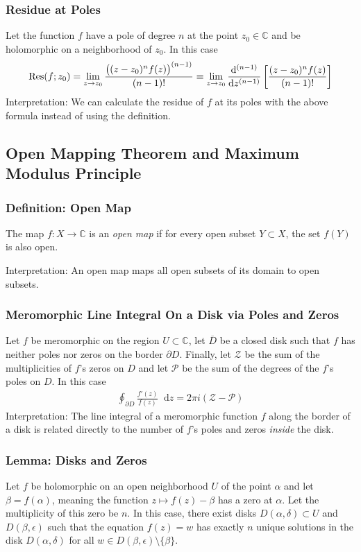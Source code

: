 \documentclass[11pt, a4paper]{article}
\newcommand{\diff}{\mathop{}\!\mathrm{d}} %
\newcommand{\C}{\mathbb{C}} %
\begin{document}
\subsubsection{Residue at Poles}
Let the function $ f $ have a pole of degree $ n $ at the point $ z_0 \in \C $ and be holomorphic on a neighborhood of $ z_0 $. In this case
\begin{align*}
	\Res(f; z_0) = \lim_{z \to z_0} \frac{\big(  (z-z_0)^n f(z)\big)^{(n-1)}}{(n-1)!} \equiv \lim_{z\to z_0} \dv[(n-1)]{}{z} \left[\frac{(z-z_0)^n f(z)}{(n-1)!}\right]
\end{align*}
Interpretation: We can calculate the residue of $ f $ at its poles with the above formula instead of using the definition.


\subsection{Open Mapping Theorem and Maximum Modulus Principle}

\subsubsection{Definition: Open Map}
The map $ f:X \to \C $ is an \textit{open map} if for every open subset $ Y \subset X $, the set $ f(Y) $ is also open.

Interpretation: An open map maps all open subsets of its domain to open subsets.

\subsubsection{Meromorphic Line Integral On a Disk via Poles and Zeros}

Let $ f $ be meromorphic on the region $ U \subset \C $, let $ \overline{D} $ be a closed disk such that $ f $ has neither poles nor zeros on the border $ \partial D $. Finally, let $ \mathcal{Z} $ be the sum of the multiplicities of $ f $'s zeros on $ D $ and let $ \mathcal{P} $ be the sum of the degrees of the $ f $'s poles on $ D $. In this case
\begin{align*}
	\oint_{\partial D}\frac{f'(z)}{f(z)}\diff z = 2\pi i (\mathcal{Z} - \mathcal{P})
\end{align*}
Interpretation: The line integral of a meromorphic function $ f $ along the border of a disk is related directly to the number of $ f $'s poles and zeros \textit{inside} the disk.

\subsubsection{Lemma: Disks and Zeros}
Let $ f $ be holomorphic on an open neighborhood $ U $ of the point $ \alpha $ and let $ \beta = f(\alpha) $, meaning the function $ z \mapsto f(z) - \beta $ has a zero at $ \alpha $. Let the multiplicity of this zero be $ n $. In this case, there exist disks $ D(\alpha, \delta) \subset U $ and $ D(\beta, \epsilon) $ such that the equation $ f(z) = w $ has exactly $ n $ unique solutions in the disk $ D(\alpha, \delta) $ for all $ w \in D(\beta, \epsilon) \setminus \{\beta \} $. 
\end{document}
